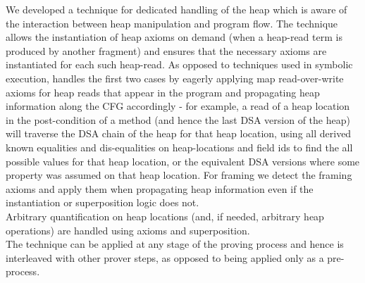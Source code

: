		We developed a technique for dedicated handling of the heap which is aware of the interaction between heap manipulation and program flow. The technique allows the instantiation of heap axioms on demand (when a heap-read term is produced by another fragment) and ensures that the necessary axioms are instantiated for each such heap-read. As opposed to techniques used in symbolic execution, 
		handles the first two cases by eagerly applying map read-over-write axioms for heap reads that appear in the program and propagating heap information along the CFG accordingly - for example, a read of a heap location in the post-condition of a method (and hence the last DSA version of the heap) will traverse the DSA chain of the heap for that heap location, using all derived known equalities and dis-equalities on heap-locations and field ids to find the all possible values for that heap location, or the equivalent DSA versions where some property was assumed on that heap location. For framing we detect the framing axioms and apply them when propagating heap information even if the instantiation or superposition logic does not.\\
		Arbitrary quantification on heap locations (and, if needed, arbitrary heap operations) are handled using axioms and superposition.\\
		The technique can be applied at any stage of the proving process and hence is interleaved with other prover steps, as opposed to being applied only as a pre-process.
	
	
	
